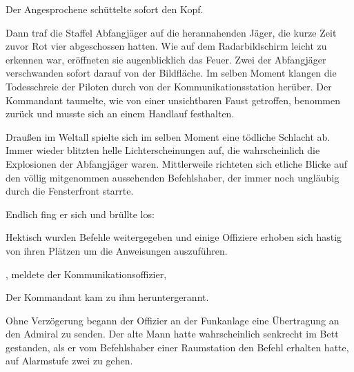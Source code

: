 Der Angesprochene schüttelte sofort den Kopf. 

\par

Dann traf die Staffel Abfangjäger auf die herannahenden Jäger, die kurze Zeit zuvor Rot vier abgeschossen hatten. Wie auf dem Radarbildschirm leicht zu erkennen war, eröffneten sie augenblicklich das Feuer. Zwei der Abfangjäger verschwanden sofort darauf von der Bildfläche. Im selben Moment klangen die Todesschreie der Piloten durch von der Kommunikationsstation herüber. Der Kommandant taumelte, wie von einer unsichtbaren Faust getroffen, benommen zurück und musste sich an einem Handlauf festhalten.

\par

Draußen im Weltall spielte sich im selben Moment eine tödliche Schlacht ab. Immer wieder blitzten helle Lichterscheinungen auf, die wahrscheinlich die Explosionen der Abfangjäger waren. Mittlerweile richteten sich etliche Blicke auf den völlig mitgenommen aussehenden Befehlshaber, der immer noch ungläubig durch die Fensterfront starrte.

\par

Endlich fing er sich und brüllte los: 

\par

Hektisch wurden Befehle weitergegeben und einige Offiziere erhoben sich hastig von ihren Plätzen um die Anweisungen auszuführen.

\par

, meldete der Kommunikationsoffizier, 

\par

Der Kommandant kam zu ihm heruntergerannt. 

\par

Ohne Verzögerung begann der Offizier an der Funkanlage eine Übertragung an den Admiral zu senden. Der alte Mann hatte wahrscheinlich senkrecht im Bett gestanden, als er vom Befehlshaber einer Raumstation den Befehl erhalten hatte, auf Alarmstufe zwei zu gehen.

